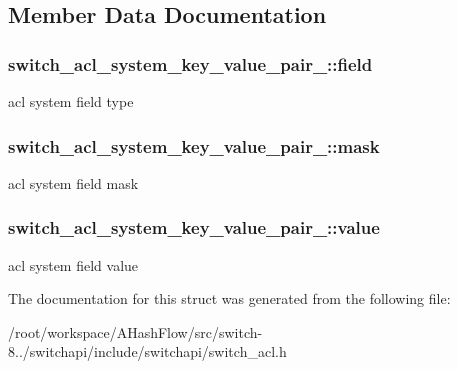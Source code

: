 \subsection{Member Data Documentation}
\hypertarget{structswitch__acl__system__key__value__pair___a981ae5882d30f4b352a566291cb433b5}{
\subsubsection[{field}]{ switch\+\_\+acl\+\_\+system\+\_\+key\+\_\+value\+\_\+pair\+\_\+\+::field}}\label{structswitch__acl__system__key__value__pair___a981ae5882d30f4b352a566291cb433b5}
acl system field type \hypertarget{structswitch__acl__system__key__value__pair___ac9e8576a7376ea7889935df70116893d}{
\subsubsection[{mask}]{ switch\+\_\+acl\+\_\+system\+\_\+key\+\_\+value\+\_\+pair\+\_\+\+::mask}}\label{structswitch__acl__system__key__value__pair___ac9e8576a7376ea7889935df70116893d}
acl system field mask \hypertarget{structswitch__acl__system__key__value__pair___aaee19313f403c714e6d42a32554888d7}{
\subsubsection[{value}]{ switch\+\_\+acl\+\_\+system\+\_\+key\+\_\+value\+\_\+pair\+\_\+\+::value}}\label{structswitch__acl__system__key__value__pair___aaee19313f403c714e6d42a32554888d7}
acl system field value 

The documentation for this struct was generated from the following file\+:\begin{DoxyCompactItemize}
\item 
/root/workspace/\+A\+Hash\+Flow/src/switch-\/8../switchapi/include/switchapi/switch\+\_\+acl.\+h\end{DoxyCompactItemize}
